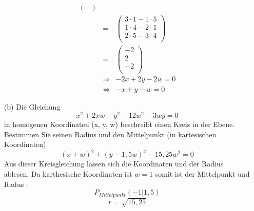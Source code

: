 \documentclass[11pt]{article}
\begin{document}
\begin{enumerate}
\begin{eqnarray*}
\begin{pmatrix}
\end{pmatrix}\\
&=& \begin{pmatrix}
3\cdot 1 - 1\cdot 5 \\
1\cdot 4 - 2\cdot 1 \\
2\cdot 5 - 3\cdot 4 \\
\end{pmatrix} \\
&=&
\begin{pmatrix}
-2 \\ 2 \\ -2\\
\end{pmatrix} \\
&\Rightarrow & -2x + 2y -2w = 0 \\
& \Leftrightarrow & -x +y -w = 0
\end{eqnarray*}
\item[(b)] Die Gleichung
$$x^2 + 2xw + y^2 - 12w^2 - 3wy = 0$$ 
in homogenen Koordinaten (x, y, w) beschreibt einen Kreis in der Ebene. Bestimmen Sie seinen Radius und den Mittelpunkt (in kartesischen Koordinaten).
$$ (x+w)^2 + (y-1,5w)^2 - 15,25w^2 = 0 $$
Aus dieser Kreisgleichung lassen sich die Koordinaten und der Radius ablesen. Da karthesische Koordinaten ist $w=1$ somit ist der Mittelpunkt und Radus :
$$ P_{Mittelpunkt}(-1|1,5)$$
$$ r = \sqrt{15,25}$$
\end{enumerate}
\end{document}
